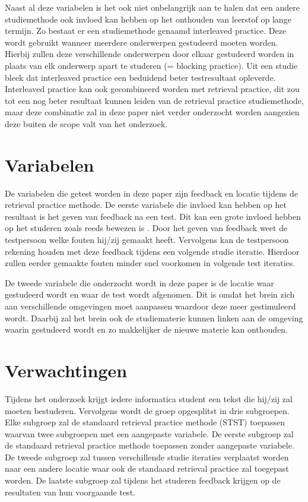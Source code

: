 \documentclass{hogent-article}
\begin{document}
    Naast al deze variabelen is het ook niet onbelangrijk aan te halen dat een andere studiemethode ook invloed kan hebben op het onthouden van leerstof op lange termijn. Zo bestaat er een studiemethode genaamd interleaved practice. Deze wordt gebruikt wanneer meerdere onderwerpen gestudeerd moeten worden. Hierbij zullen deze verschillende onderwerpen door elkaar gestudeerd worden in plaats van elk onderwerp apart te studeren (= blocking practice). Uit een studie \autocite{taylor2010effects} bleek dat interleaved practice een beduidend beter testresultaat opleverde. Interleaved practice kan ook gecombineerd worden met retrieval practice, dit zou tot een nog beter resultaat kunnen leiden van de retrieval practice studiemethode, maar deze combinatie zal in deze paper niet verder onderzocht worden aangezien deze buiten de scope valt van het onderzoek.
    
	
	\section{Variabelen}    
    De variabelen die getest worden in deze paper zijn feedback en locatie tijdens de retrieval practice methode.
    De eerste variabele die invloed kan hebben op het resultaat is het geven van feedback na een test. Dit kan een grote invloed hebben op het studeren zoals reeds bewezen is \autocite{roediger2011critical, brame2015test}.
    Door het geven van feedback weet de testpersoon welke fouten hij/zij gemaakt heeft. Vervolgens kan de testpersoon rekening houden met deze feedback tijdens een volgende studie iteratie. Hierdoor zullen eerder gemaakte fouten minder snel voorkomen in volgende test iteraties.
    
    De tweede variabele die onderzocht wordt in deze paper is de locatie waar gestudeerd wordt en waar de test wordt afgenomen. Dit is omdat het brein zich aan verschillende omgevingen moet aanpassen waardoor deze meer gestimuleerd wordt. Daarbij zal het brein ook de studiematerie kunnen linken aan de omgeving waarin gestudeerd wordt en zo makkelijker de nieuwe materie kan onthouden.
    
    \section{Verwachtingen}
    Tijdens het onderzoek krijgt iedere informatica student een tekst die hij/zij zal moeten bestuderen. Vervolgens wordt de groep opgesplitst in drie subgroepen. Elke subgroep zal de standaard retrieval practice methode (STST) toepassen waarvan twee subgroepen met een aangepaste variabele.
    De eerste subgroep zal de standaard retrieval practice methode toepassen zonder aangepaste variabele. 
    De tweede subgroep zal tussen verschillende studie iteraties verplaatst worden naar een andere locatie waar ook de standaard retrieval practice zal toegepast worden.
    De laatste subgroep zal tijdens het studeren feedback krijgen op de resultaten van hun voorgaande test.
    
\end{document}
